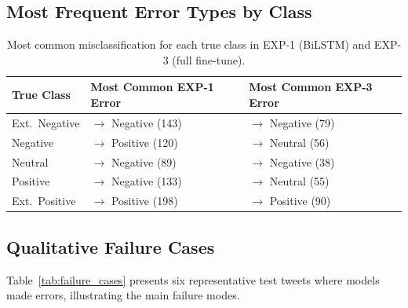 \subsection{Most Frequent Error Types by Class}

\begin{table}[H]
    \centering
    \caption{Most common misclassification for each true class in EXP-1 (BiLSTM) and EXP-3 (full fine-tune).}
    \label{tab:most_common_error}
    \begin{tabularx}{\textwidth}{l l l}
        \toprule
        \textbf{True Class} & \textbf{Most Common EXP-1 Error} & \textbf{Most Common EXP-3 Error} \\
        \midrule
        Ext.\ Negative   & $\to$ Negative (143)        & $\to$ Negative (79)  \\
        Negative          & $\to$ Positive (120)         & $\to$ Neutral (56)   \\
        Neutral           & $\to$ Negative (89)          & $\to$ Negative (38)  \\
        Positive          & $\to$ Negative (133)         & $\to$ Neutral (55)   \\
        Ext.\ Positive   & $\to$ Positive (198)         & $\to$ Positive (90)  \\
        \bottomrule
    \end{tabularx}
\end{table}

\subsection{Qualitative Failure Cases}

Table~\ref{tab:failure_cases} presents six representative test tweets where models made errors, illustrating the main failure modes.

